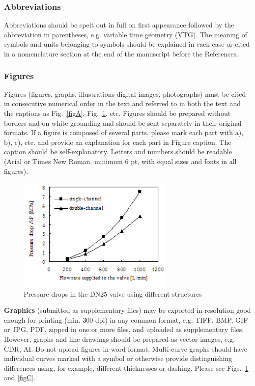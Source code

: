 \documentclass[10pt]{JoME}
\begin{document}
\subsubsection{Abbreviations}
Abbreviations should be spelt out in full on first appearance followed by the abbreviation in parentheses, e.g. variable time geometry (VTG). The meaning of symbols and units belonging to symbols should be explained in each case or cited in a nomenclature section at the end of the manuscript before the References.

\subsubsection{Figures}
Figures (figures, graphs, illustrations digital images, photographs) must be cited in consecutive numerical order in the text and referred to in both the text and the captions as Fig.~\ref{figA}, Fig.~\ref{figB}, etc. Figures should be prepared without borders and on white grounding and should be sent separately in their original formats. If a figure is composed of several parts, please mark each part with a), b), c), etc. and provide an explanation for each part in Figure caption. The caption should be self-explanatory. Letters and numbers should be readable (Arial or Times New Roman, minimum 6 pt, with equal sizes and fonts in all figures).

\begin{figure}[h]
\includegraphics[width=76.5mm]{fig2.png}
\caption{Pressure drops in the DN25 valve using different structures\label{figB}}
\end{figure}
 
 
\textbf{Graphics} (submitted as supplementary files) may be exported in resolution good enough for printing (min. 300 dpi) in any common format, e.g. TIFF, BMP, GIF or JPG, PDF, zipped in one or more files, and uploaded as supplementary files. However, graphs and line drawings should be prepared as vector images, e.g. CDR, AI. Do not upload figures in word format.
Multi-curve graphs should have individual curves marked with a symbol or otherwise provide distinguishing differences using, for example, different thicknesses or dashing. Please see Figs.~\ref{figB} and \ref{figC}.
\end{document}
